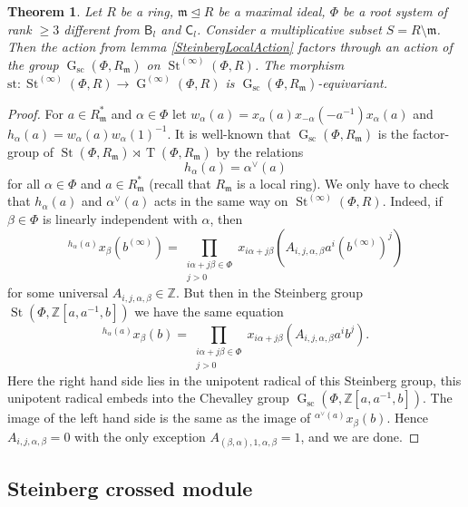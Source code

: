 \documentclass{article}
\numberwithin{equation}{section}
\newtheorem{theorem}{Theorem}
\theoremstyle{definition}
\theoremstyle{remark}
\DeclareMathOperator\St{St}
\DeclareMathOperator\GG{G}
\DeclareMathOperator\Torus{T}
\newcommand{\up}[2]{{^{#1}\!{#2}}}
\newcommand{\rB}{\mathsf{B}}
\newcommand{\rC}{\mathsf{C}}
\begin{document}
\begin{theorem}\label{ChevalleyLocalAction}
 Let \(R\) be a ring, \(\mathfrak m \trianglelefteq R\) be a maximal ideal, \(\Phi\) be a root system of rank \(\geq 3\) different from \(\rB_l\) and \(\rC_l\). Consider a multiplicative subset \(S = R \setminus \mathfrak m\). Then the action from lemma \ref{SteinbergLocalAction} factors through an action of the group \(\GG_{\mathrm{sc}}(\Phi, R_{\mathfrak m})\) on \(\St^{(\infty)}(\Phi, R)\). The morphism \(\mathrm{st} \colon \St^{(\infty)}(\Phi, R) \to \GG^{(\infty)}(\Phi, R)\) is \(\GG_{\mathrm{sc}}(\Phi, R_{\mathfrak m})\)-equivariant.
\end{theorem}
\begin{proof}
 For \(a \in R_{\mathfrak m}^*\) and \(\alpha \in \Phi\) let \(w_\alpha(a) = x_\alpha(a) x_{-\alpha}(-a^{-1}) x_\alpha(a)\) and \(h_\alpha(a) = w_\alpha(a) w_\alpha(1)^{-1}\). It is well-known that \(\GG_{\mathrm{sc}}(\Phi, R_{\mathfrak m})\) is the factor-group of \(\St(\Phi, R_{\mathfrak m}) \rtimes \Torus(\Phi, R_{\mathfrak m})\) by the relations
 \[h_\alpha(a) = \alpha^\vee(a)\]
 for all \(\alpha \in \Phi\) and \(a \in R_{\mathfrak m}^*\) (recall that \(R_{\mathfrak m}\) is a local ring). We only have to check that \(h_\alpha(a)\) and \(\alpha^\vee(a)\) acts in the same way on \(\St^{(\infty)}(\Phi, R)\). Indeed, if \(\beta \in \Phi\) is linearly independent with \(\alpha\), then
 \[\up{h_\alpha(a)}{x_\beta(b^{(\infty)})} = \prod_{\substack{i\alpha + j\beta \in \Phi\\ j > 0}} x_{i\alpha + j\beta}(A_{i, j, \alpha, \beta} a^i (b^{(\infty)})^j)\]
 for some universal \(A_{i, j, \alpha, \beta} \in \mathbb Z\). But then in the Steinberg group \(\St(\Phi, \mathbb Z[a, a^{-1}, b])\) we have the same equation
 \[\up{h_\alpha(a)}{x_\beta(b)} = \prod_{\substack{i\alpha + j\beta \in \Phi\\ j > 0}} x_{i\alpha + j\beta}(A_{i, j, \alpha, \beta} a^i b^j).\]
 Here the right hand side lies in the unipotent radical of this Steinberg group, this unipotent radical embeds into the Chevalley group \(\GG_{\mathrm{sc}}(\Phi, \mathbb Z[a, a^{-1}, b])\). The image of the left hand side is the same as the image of \(\up{\alpha^\vee(a)}{x_\beta(b)}\). Hence \(A_{i, j, \alpha, \beta} = 0\) with the only exception \(A_{(\beta, \alpha), 1, \alpha, \beta} = 1\), and we are done.
\end{proof}


\subsection{Steinberg crossed module}
\end{document}
